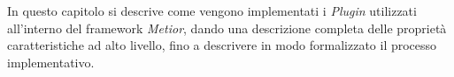 In questo capitolo si descrive come vengono implementati i \emph{Plugin} utilizzati all'interno del framework \emph{Metior},
dando una descrizione completa delle proprietà caratteristiche ad alto livello, fino a descrivere in modo formalizzato
il processo implementativo.
